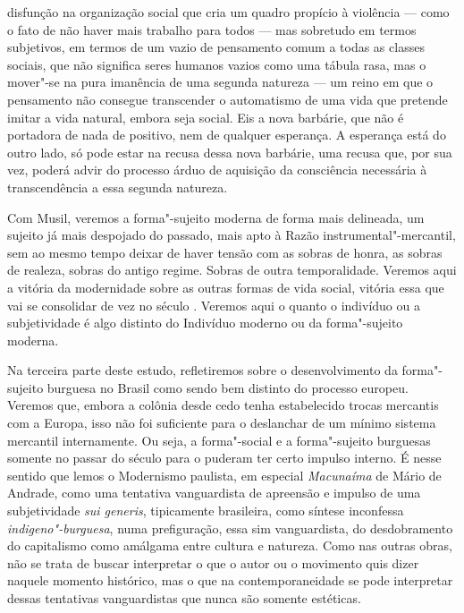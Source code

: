 disfunção na organização social que cria um quadro propício à violência
--- como o fato de não haver mais trabalho para todos --- mas sobretudo em
termos subjetivos, em termos de um vazio de pensamento comum a todas as
classes sociais, que não significa seres humanos vazios como uma tábula
rasa, mas o mover"-se na pura imanência de uma segunda natureza --- um
reino em que o pensamento não consegue transcender o automatismo de uma
vida que pretende imitar a vida natural, embora seja social. Eis a nova
barbárie, que não é portadora de nada de positivo, nem de qualquer
esperança. A esperança está do outro lado, só pode estar na recusa dessa
nova barbárie, uma recusa que, por sua vez, poderá advir do processo
árduo de aquisição da consciência necessária à transcendência a essa
segunda natureza.

Com Musil, veremos a forma"-sujeito moderna de forma mais delineada, um
sujeito já mais despojado do passado, mais apto à Razão
instrumental"-mercantil, sem ao mesmo tempo deixar de haver tensão com as
sobras de honra, as sobras de realeza, sobras do antigo regime. Sobras
de outra temporalidade. Veremos aqui a vitória da modernidade sobre as
outras formas de vida social, vitória essa que vai se consolidar de vez
no século . Veremos aqui o quanto o indivíduo ou a subjetividade é
algo distinto do Indivíduo moderno ou da forma"-sujeito moderna.

Na terceira parte deste estudo, refletiremos sobre o desenvolvimento da
forma"-sujeito burguesa no Brasil como sendo bem distinto do processo
europeu. Veremos que, embora a colônia desde cedo tenha estabelecido
trocas mercantis com a Europa, isso não foi suficiente para o deslanchar
de um mínimo sistema mercantil internamente. Ou seja, a forma"-social e a
forma"-sujeito burguesas somente no passar do século  para o 
puderam ter certo impulso interno. É nesse sentido que lemos o
Modernismo paulista, em especial \emph{Macunaíma} de Mário de Andrade,
como uma tentativa vanguardista de apreensão e impulso de uma
subjetividade \emph{sui generis}, tipicamente brasileira, como
síntese inconfessa \emph{indigeno"-burguesa}, numa prefiguração,
essa sim vanguardista, do desdobramento do capitalismo como amálgama
entre cultura e natureza. Como nas outras obras, não se trata de buscar
interpretar o que o autor ou o movimento quis dizer naquele momento
histórico, mas o que na contemporaneidade se pode interpretar dessas
tentativas vanguardistas que nunca são somente estéticas.

